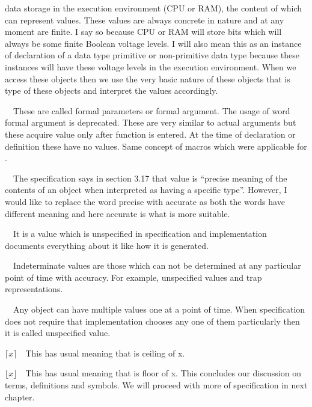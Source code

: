   data storage in the execution environment (CPU or RAM), the content
  of which can represent values. These values are always concrete in
  nature and at any moment are finite. I say so because CPU or RAM
  will store bits which will always be some finite Boolean voltage
  levels. I will also mean this as an instance of declaration of a
  data type primitive or non-primitive data type because these
  instances will have these voltage levels in the execution
  environment. When we access \at[access] these objects then we use
  the very basic nature of these objects that is type of these objects
  and interpret the values accordingly.
\item{}\textreference[parameter]~~These are called
  formal parameters or formal argument. The usage of word formal
  argument is deprecated. These are very similar to actual arguments
  but these acquire value only after function is entered. At the time
  of declaration or definition these have no values. Same concept of
  macros which were applicable for \at[argument].
\item{}\textreference[value]~~The specification says in
  section 3.17 that value is ``precise meaning of the contents of an
  object when interpreted as having a specific type''. However, I
  would like to replace the word precise with accurate as both the
  words have different meaning and here accurate is what is more
  suitable.
\startitemize[R]
\item{}~~It is a value
  which is unspecified in specification and implementation documents
  everything about it like how it is generated.
\item{}~~Indeterminate values are those which can not be determined
  at any particular point of time with accuracy. For example,
  unspecified values and trap representations.
\item{}~~Any
  object can have multiple values one at a point of time. When
  specification does not require that implementation chooses any one
  of them particularly then it is called unspecified value.
\stopitemize
\item{$\lceil x\rceil$}\textreference[ceilx]~~This has usual meaning
  that is ceiling of x.
\item{$\lfloor x\rfloor$}\textreference[floorx]~~This has usual meaning
  that is floor of x.
\stopitemize
This concludes our discussion on terms, definitions and symbols. We
will proceed with more of specification in next chapter.
